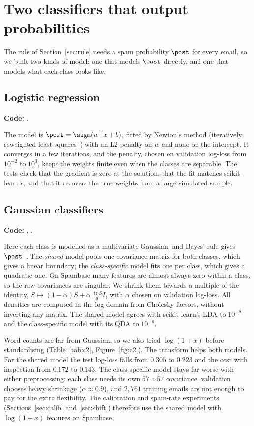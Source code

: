 \section{Two classifiers that output probabilities}
\label{sec:models}
The rule of Section~\ref{sec:rule} needs a spam probability $\post$ for every email, so we built two
kinds of model: one that models $\post$ directly, and one that models what each class looks like.

\subsection{Logistic regression}
\label{sec:logistic}
\textbf{Code:} .

The model is $\post=\sigm(w^\top x+b)$, fitted by Newton's method (iteratively reweighted least
squares~\cite[Section~4.3]{bishop2006}) with an L2 penalty on $w$ and none on the intercept. It converges in a few iterations, and
the penalty, chosen on validation log-loss from $10^{-2}$ to $10^{3}$, keeps the weights finite even
when the classes are separable. The tests check that the gradient is zero at the solution, that the
fit matches scikit-learn's, and that it recovers the true weights from a large simulated sample.

\subsection{Gaussian classifiers }
\label{sec:gaussian}
\textbf{Code:} , .

Here each class is modelled as a multivariate Gaussian, and Bayes' rule gives
$\post$~\cite[Section~4.2]{bishop2006}. The
\emph{shared} model pools one covariance matrix for both classes, which gives a linear boundary; the
\emph{class-specific} model fits one per class, which gives a quadratic one. On Spambase many features
are almost always zero within a class, so the raw covariances are singular. We shrink them towards a
multiple of the identity, $S\mapsto(1-\alpha)S+\alpha\,\tfrac{\operatorname{tr}S}{d}I$, with $\alpha$
chosen on validation log-loss. All densities are computed in the log domain from Cholesky factors,
without inverting any matrix. The shared model agrees with scikit-learn's LDA to $10^{-8}$ and the
class-specific model with its QDA to $10^{-6}$.

Word counts are far from Gaussian, so we also tried $\log(1+x)$ before standardising
(Table~\ref{tab:c2}, Figure~\ref{fig:c2}). The transform helps both models. For the shared model the
test log-loss falls from $0.305$ to $0.223$ and the cost with inspection from $0.172$ to $0.143$. The
class-specific model stays far worse with either preprocessing: each class needs its own
$57\times57$ covariance, validation chooses heavy shrinkage ($\alpha\approx0.9$), and $2{,}761$
training emails are not enough to pay for the extra flexibility. The calibration and spam-rate
experiments (Sections~\ref{sec:calib} and~\ref{sec:shift}) therefore use the shared model with
$\log(1+x)$ features on Spambase.

